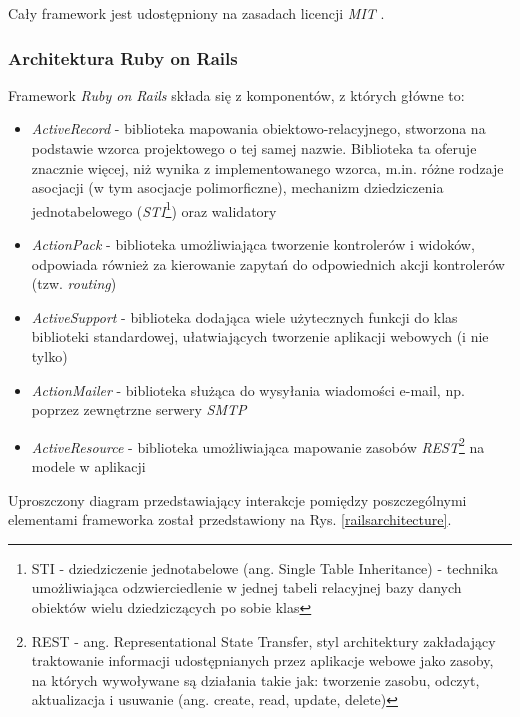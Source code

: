 \documentclass[a4paper,12pt]{article}
\providecommand{\imref}[1]{Rys. \ref{#1}} %
\begin{document}
Cały framework jest udostępniony na zasadach licencji \emph{MIT}
\cite{mit}.

\subsubsection{Architektura Ruby on Rails}
Framework \emph{Ruby on Rails} składa się z komponentów, z których
główne to:

\begin{itemize}
\item \emph{ActiveRecord} - biblioteka mapowania
  obiektowo-relacyjnego, stworzona na podstawie wzorca projektowego o
  tej samej nazwie\cite{activerecord}. Biblioteka ta oferuje znacznie
  więcej, niż wynika z implementowanego wzorca, m.in. różne rodzaje
  asocjacji (w tym asocjacje polimorficzne\cite{polymorphic}),
  mechanizm dziedziczenia jednotabelowego (\emph{STI}\footnote{STI -
    dziedziczenie jednotabelowe (ang. Single Table Inheritance) -
    technika umożliwiająca odzwierciedlenie w jednej tabeli relacyjnej
    bazy danych obiektów wielu dziedziczących po sobie
    klas\cite{sti}}) oraz walidatory
\item \emph{ActionPack} - biblioteka umożliwiająca tworzenie
  kontrolerów i widoków, odpowiada również za kierowanie zapytań do
  odpowiednich akcji kontrolerów (tzw. \emph{routing})
\item \emph{ActiveSupport} - biblioteka dodająca wiele użytecznych
  funkcji do klas biblioteki standardowej, ułatwiających tworzenie
  aplikacji webowych (i nie tylko)
\item \emph{ActionMailer} - biblioteka służąca do wysyłania wiadomości
  e-mail, np. poprzez zewnętrzne serwery \emph{SMTP}
\item \emph{ActiveResource} - biblioteka umożliwiająca mapowanie
  zasobów \emph{REST}\footnote{REST - ang. Representational State
    Transfer, styl architektury zakładający traktowanie informacji
    udostępnianych przez aplikacje webowe jako zasoby, na których
    wywoływane są działania takie jak: tworzenie zasobu, odczyt,
    aktualizacja i usuwanie (ang. create, read, update,
    delete)\cite{rest}} na modele w aplikacji
\end{itemize}

Uproszczony diagram przedstawiający interakcje pomiędzy poszczególnymi
elementami frameworka został przedstawiony na
\imref{railsarchitecture}.
\end{document}
